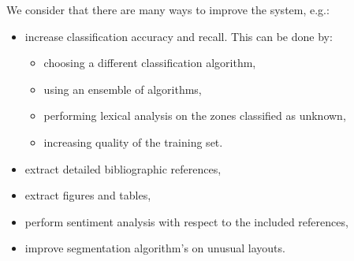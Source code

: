 We consider that there are many ways to improve the system, e.g.:
\begin{itemize}
\item increase classification accuracy and recall. This can be done by:
	\begin{itemize}
		\item choosing a different classification algorithm,
		\item using an ensemble of algorithms,
		\item performing lexical analysis on the zones classified as unknown,
		\item increasing quality of the training set.
	\end{itemize}
\item extract detailed bibliographic references,
\item extract figures and tables,
\item perform sentiment analysis with respect to the included references,
\item improve segmentation algorithm's on unusual layouts.
\end{itemize}